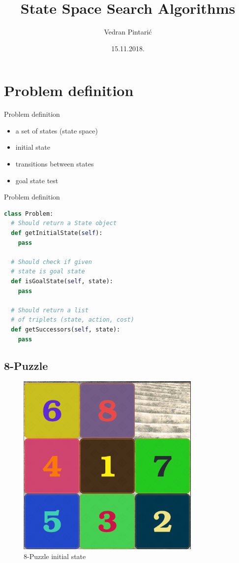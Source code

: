 \documentclass{beamer}
\title[State Space Search Algorithms]{State Space Search Algorithms}
\author{Vedran Pintarić}
\date{15.11.2018.}
\begin{document}
\begin{frame}
  \titlepage
\end{frame}

\section{Problem definition}

\begin{frame}{Problem definition}

	\begin{itemize}
		\item a set of states (state space)
		\item initial state
		\item transitions between states
		\item goal state test
	\end{itemize}

\end{frame}

\begin{frame}[fragile]{Problem definition}

	\begin{lstlisting}[language=Python]
class Problem:
  # Should return a State object
  def getInitialState(self):
    pass

  # Should check if given
  # state is goal state
  def isGoalState(self, state):
    pass

  # Should return a list
  # of triplets (state, action, cost)
  def getSuccessors(self, state):
    pass
	\end{lstlisting}

\end{frame}

\subsection{8-Puzzle}

\begin{frame}
	\begin{figure}
	\centering
		\includegraphics[width=0.5\linewidth]{puzzle8.png}
		\caption{8-Puzzle initial state}
	\end{figure}
\end{frame}
\end{document}
